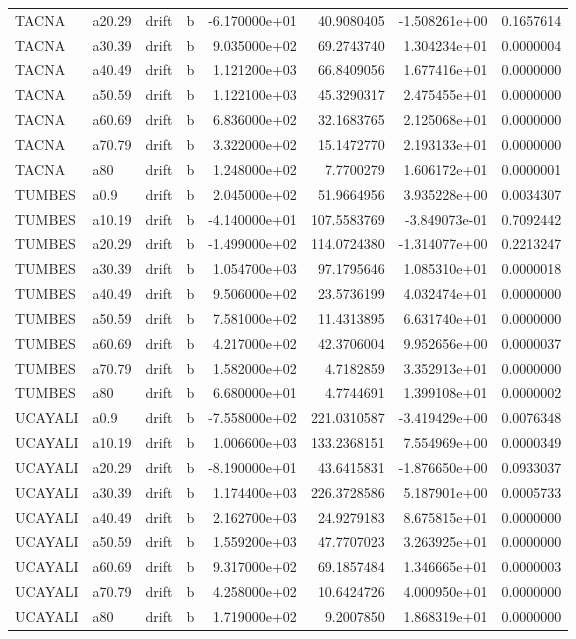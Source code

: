 \documentclass[
]{article}
\begin{document}
\begin{table}[!h]
\begin{tabular}[t]{llllrrrr}
TACNA & a20.29 & drift & b & -6.170000e+01 & 40.9080405 & -1.508261e+00 & 0.1657614\\
\addlinespace
TACNA & a30.39 & drift & b & 9.035000e+02 & 69.2743740 & 1.304234e+01 & 0.0000004\\
TACNA & a40.49 & drift & b & 1.121200e+03 & 66.8409056 & 1.677416e+01 & 0.0000000\\
TACNA & a50.59 & drift & b & 1.122100e+03 & 45.3290317 & 2.475455e+01 & 0.0000000\\
TACNA & a60.69 & drift & b & 6.836000e+02 & 32.1683765 & 2.125068e+01 & 0.0000000\\
TACNA & a70.79 & drift & b & 3.322000e+02 & 15.1472770 & 2.193133e+01 & 0.0000000\\
\addlinespace
TACNA & a80 & drift & b & 1.248000e+02 & 7.7700279 & 1.606172e+01 & 0.0000001\\
TUMBES & a0.9 & drift & b & 2.045000e+02 & 51.9664956 & 3.935228e+00 & 0.0034307\\
TUMBES & a10.19 & drift & b & -4.140000e+01 & 107.5583769 & -3.849073e-01 & 0.7092442\\
TUMBES & a20.29 & drift & b & -1.499000e+02 & 114.0724380 & -1.314077e+00 & 0.2213247\\
TUMBES & a30.39 & drift & b & 1.054700e+03 & 97.1795646 & 1.085310e+01 & 0.0000018\\
\addlinespace
TUMBES & a40.49 & drift & b & 9.506000e+02 & 23.5736199 & 4.032474e+01 & 0.0000000\\
TUMBES & a50.59 & drift & b & 7.581000e+02 & 11.4313895 & 6.631740e+01 & 0.0000000\\
TUMBES & a60.69 & drift & b & 4.217000e+02 & 42.3706004 & 9.952656e+00 & 0.0000037\\
TUMBES & a70.79 & drift & b & 1.582000e+02 & 4.7182859 & 3.352913e+01 & 0.0000000\\
TUMBES & a80 & drift & b & 6.680000e+01 & 4.7744691 & 1.399108e+01 & 0.0000002\\
\addlinespace
UCAYALI & a0.9 & drift & b & -7.558000e+02 & 221.0310587 & -3.419429e+00 & 0.0076348\\
UCAYALI & a10.19 & drift & b & 1.006600e+03 & 133.2368151 & 7.554969e+00 & 0.0000349\\
UCAYALI & a20.29 & drift & b & -8.190000e+01 & 43.6415831 & -1.876650e+00 & 0.0933037\\
UCAYALI & a30.39 & drift & b & 1.174400e+03 & 226.3728586 & 5.187901e+00 & 0.0005733\\
UCAYALI & a40.49 & drift & b & 2.162700e+03 & 24.9279183 & 8.675815e+01 & 0.0000000\\
\addlinespace
UCAYALI & a50.59 & drift & b & 1.559200e+03 & 47.7707023 & 3.263925e+01 & 0.0000000\\
UCAYALI & a60.69 & drift & b & 9.317000e+02 & 69.1857484 & 1.346665e+01 & 0.0000003\\
UCAYALI & a70.79 & drift & b & 4.258000e+02 & 10.6424726 & 4.000950e+01 & 0.0000000\\
UCAYALI & a80 & drift & b & 1.719000e+02 & 9.2007850 & 1.868319e+01 & 0.0000000\\
\bottomrule
\end{tabular}
\end{table}
\end{document}
